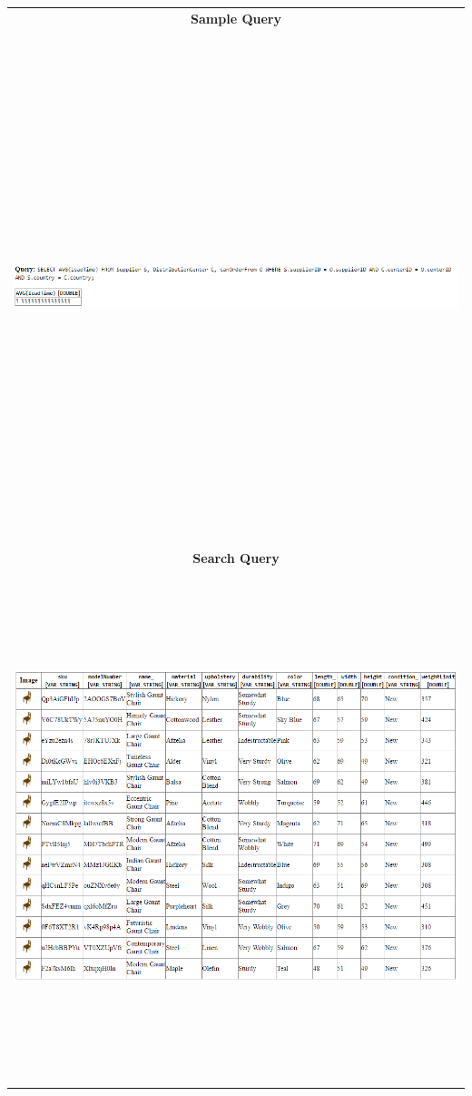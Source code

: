 \documentclass[american,extrafontsizes,12pt,portrait,letterpaper,oneside,onecolumn,final]{memoir}
\begin{document}
\begin{longtabu}{|c|}
\hline
\textbf{Sample Query}\\*
\includegraphics[keepaspectratio=true,width=40em,height=40em]{snapshots/sampleQuery.png}\\
\hline
\textbf{Search Query}\\*
\includegraphics[keepaspectratio=true,width=40em,height=40em]{snapshots/sampleSearch.PNG}\\

\end{longtabu}
\end{document}
